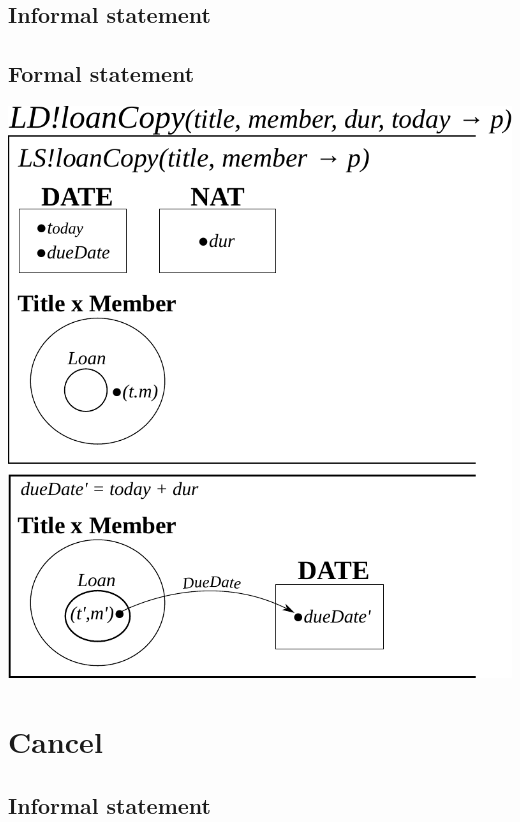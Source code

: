 \documentclass[]{article}
\begin{document}
\subsection{Informal statement}
\subsection{Formal statement}
\begin{center}
	\includegraphics[scale=0.75]{loan_copy.pdf}
\end{center}

\section{Cancel}
\subsection{Informal statement}
\end{document}
